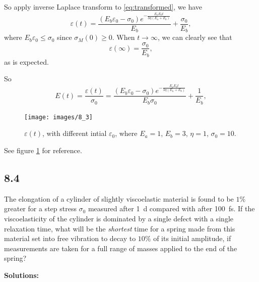 \documentclass[12pt]{article}
\begin{document}
So apply inverse Laplace transform to \eqref{eq:transformed}, we have
\begin{equation}
  \varepsilon(t) = \frac{(E_b \varepsilon_0-\sigma_0) e^{-\frac{E_a E_b t}{3 \eta (E_a + E_b)}}}{E_b}+\frac{\sigma_0}{E_b},
\end{equation}
where $E_b \varepsilon_0 \leq \sigma_0$ since $\sigma_M(0) \geq 0$.
When $t \rightarrow \infty$, we can clearly see that
\begin{equation}
  \varepsilon(\infty) = \frac{\sigma_0}{E_b},
\end{equation}
as is expected.

So
\begin{equation}
  E(t) = \frac{ \varepsilon(t) }{ \sigma_0 } = \frac{(E_b \varepsilon_0-\sigma_0) e^{-\frac{E_a E_b t}{3 \eta (E_a + E_b)}}}{E_b \sigma_0}+\frac{1}{E_b},
\end{equation}
\begin{figure}[h]
  \centering
  \texttt{[image: images/8\_3]}
  \caption{$\varepsilon(t)$, with different intial $\varepsilon_0$, where $E_a = 1$, $E_b = 3$, $\eta = 1$, $\sigma_0 = 10$.}
  \label{fig:question_8_3}
\end{figure}

See figure \ref{fig:question_8_3} for reference.

\subsection{8.4}
The elongation of a cylinder of slightly viscoelastic material is found to be
$1\%$ greater for a step stress $\sigma_0$ measured after \SI{1}{\day} compared with after \SI{100}{\femto\second}.
If the viscoelasticity of the cylinder is dominated by a single defect
with a single relaxation time, what will be the \emph{shortest} time for a spring made from this
material set into free vibration to decay to $10\%$ of its initial amplitude,
if measurements are taken for a full range of masses applied to the end of the spring?

\textbf{Solutions:}
\end{document}
